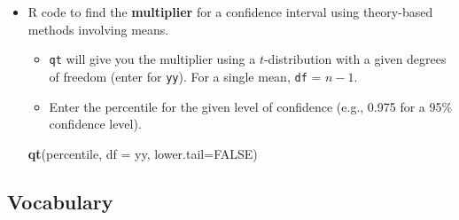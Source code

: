 \documentclass[
]{report}
\newenvironment{Shaded}{\begin{snugshade}}{\end{snugshade}}
\newcommand{\AttributeTok}[1]{\textcolor[rgb]{0.13,0.29,0.53}{#1}}
\newcommand{\ConstantTok}[1]{\textcolor[rgb]{0.56,0.35,0.01}{#1}}
\newcommand{\FunctionTok}[1]{\textcolor[rgb]{0.13,0.29,0.53}{\textbf{#1}}}
\newcommand{\NormalTok}[1]{#1}
\begin{document}
\newpage

\begin{itemize}
\item
  R code to find the \textbf{multiplier} for a confidence interval using theory-based methods involving means.

  \begin{itemize}
  \item
    \texttt{qt} will give you the multiplier using a \(t\)-distribution with a given degrees of freedom (enter for \texttt{yy}). For a single mean, \texttt{df} = \(n - 1\).
  \item
    Enter the percentile for the given level of confidence (e.g., 0.975 for a 95\% confidence level).
  \end{itemize}

\begin{Shaded}
\begin{Highlighting}[]
\FunctionTok{qt}\NormalTok{(percentile, }\AttributeTok{df =}\NormalTok{ yy, }\AttributeTok{lower.tail=}\ConstantTok{FALSE}\NormalTok{)}
\end{Highlighting}
\end{Shaded}
\end{itemize}

\subsection*{Vocabulary}\label{vocabulary-5}
\end{document}
